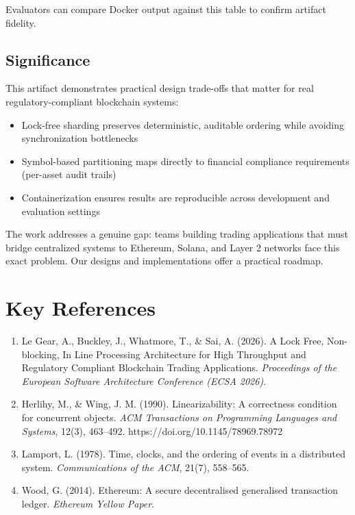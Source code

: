 \documentclass[conference]{IEEEtran}
\begin{document}
Evaluators can compare Docker output against this table to confirm artifact fidelity.

\subsection*{Significance}

This artifact demonstrates practical design trade-offs that matter for real regulatory-compliant blockchain systems:
\begin{itemize}
\item Lock-free sharding preserves deterministic, auditable ordering while avoiding synchronization bottlenecks
\item Symbol-based partitioning maps directly to financial compliance requirements (per-asset audit trails)
\item Containerization ensures results are reproducible across development and evaluation settings
\end{itemize}

The work addresses a genuine gap: teams building trading applications that must bridge centralized systems to Ethereum, Solana, and Layer 2 networks face this exact problem. Our designs and implementations offer a practical roadmap.

\section*{Key References}

\begin{enumerate}
\item Le Gear, A., Buckley, J., Whatmore, T., \& Sai, A. (2026). A Lock Free, Non-blocking, In Line Processing Architecture for High Throughput and Regulatory Compliant Blockchain Trading Applications. \textit{Proceedings of the European Software Architecture Conference (ECSA 2026)}.
\item Herlihy, M., \& Wing, J. M. (1990). Linearizability: A correctness condition for concurrent objects. \textit{ACM Transactions on Programming Languages and Systems}, 12(3), 463--492. https://doi.org/10.1145/78969.78972
\item Lamport, L. (1978). Time, clocks, and the ordering of events in a distributed system. \textit{Communications of the ACM}, 21(7), 558--565.
\item Wood, G. (2014). Ethereum: A secure decentralised generalised transaction ledger. \textit{Ethereum Yellow Paper}.
\end{enumerate}
\end{document}
